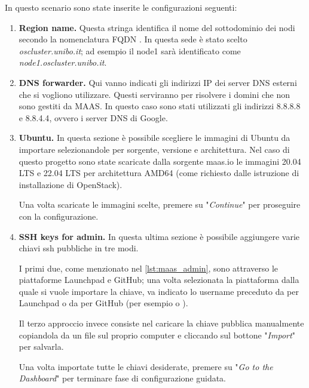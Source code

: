 In questo scenario sono state inserite le configurazioni seguenti:
% 
\begin{enumerate}
    \item \textbf{Region name.} Questa stringa identifica il nome del sottodominio dei nodi secondo la nomenclatura FQDN \cite{fqdn}.
    In questa sede è stato scelto \emph{oscluster.unibo.it}; ad esempio il node1 sarà identificato come \emph{node1.oscluster.unibo.it}.

    \item \textbf{DNS forwarder.} Qui vanno indicati gli indirizzi IP dei server DNS esterni che si vogliono utilizzare. Questi serviranno per risolvere i domini che non sono gestiti da MAAS.
    In questo caso sono stati utilizzati gli indirizzi \colorbox{lgray}{8.8.8.8} e \colorbox{lgray}{8.8.4.4}, ovvero i server DNS di Google.

    \item
    \label{itm:image_ubuntu}
    \textbf{Ubuntu.} In questa sezione è possibile scegliere le immagini di Ubuntu da importare selezionandole per sorgente, versione e architettura.
    Nel caso di questo progetto sono state scaricate dalla sorgente maas.io le immagini 20.04 LTS e 22.04 LTS per architettura AMD64 (come richiesto dalle istruzione di installazione di OpenStack).

    Una volta scaricate le immagini scelte, premere su "\emph{Continue}" per proseguire con la configurazione.

    \item
    \label{itm:ssh_admin}
    \textbf{SSH keys for admin.} In questa ultima sezione è possibile aggiungere varie chiavi ssh pubbliche in tre modi.
    
    I primi due, come menzionato nel \cref{lst:maas_admin}, sono attraverso le piattaforme Launchpad e GitHub;
    una volta selezionata la piattaforma dalla quale si vuole importare la chiave, va indicato lo username preceduto da  per Launchpad o da  per GitHub (per esempio  o ).
    
    Il terzo approccio invece consiste nel caricare la chiave pubblica manualmente copiandola da un file sul proprio computer e cliccando sul bottone "\emph{Import}" per salvarla.
    
    Una volta importate tutte le chiavi desiderate, premere su "\emph{Go to the Dashboard}" per terminare fase di configurazione guidata.
\end{enumerate}

